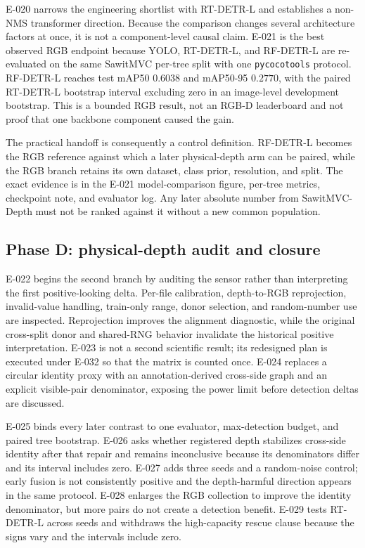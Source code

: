\documentclass[preprint,12pt]{elsarticle}
\newcommand{\mAP}{mAP}
\begin{document}
E-020 narrows the engineering shortlist with RT-DETR-L and establishes a
non-NMS transformer direction. Because the comparison changes several
architecture factors at once, it is not a component-level causal claim.
E-021 is the best observed RGB endpoint because YOLO, RT-DETR-L, and RF-DETR-L are
re-evaluated on the same SawitMVC per-tree split with one
\texttt{pycocotools} protocol. RF-DETR-L reaches test \mAP50 \(0.6038\) and
\mAP50-95 \(0.2770\), with the paired RT-DETR-L bootstrap interval excluding
zero in an image-level development bootstrap. This is a bounded RGB result,
not an RGB-D leaderboard and not proof
that one backbone component caused the gain.

The practical handoff is consequently a control definition. RF-DETR-L becomes
the RGB reference against which a later physical-depth arm can be paired, while
the RGB branch retains its own dataset, class prior, resolution, and split.
The exact evidence is in the E-021 model-comparison figure, per-tree metrics,
checkpoint note, and evaluator log. Any later absolute number from
SawitMVC-Depth must not be ranked against it without a new common population.

\subsection{Phase D: physical-depth audit and closure}
E-022 begins the second branch by auditing the sensor rather than interpreting
the first positive-looking delta. Per-file calibration, depth-to-RGB
reprojection, invalid-value handling, train-only range, donor selection, and
random-number use are inspected. Reprojection improves the alignment
diagnostic, while the original cross-split donor and shared-RNG behavior
invalidate the historical positive interpretation. E-023 is not a second
scientific result; its redesigned plan is executed under E-032 so that the
matrix is counted once. E-024 replaces a circular identity proxy with an
annotation-derived cross-side graph and an explicit visible-pair denominator,
exposing the power
limit before detection deltas are discussed.

E-025 binds every later contrast to one evaluator, max-detection budget, and
paired tree bootstrap. E-026 asks whether registered depth stabilizes
cross-side identity after that repair and remains inconclusive because its
denominators differ and its interval includes zero.
E-027 adds three seeds and a random-noise control; early fusion is not
consistently positive and the depth-harmful direction appears in the same
protocol. E-028 enlarges the RGB collection to improve the identity
denominator, but more pairs do not create a detection benefit. E-029 tests
RT-DETR-L across seeds and withdraws the high-capacity rescue clause because
the signs vary and the intervals include zero.
\end{document}
